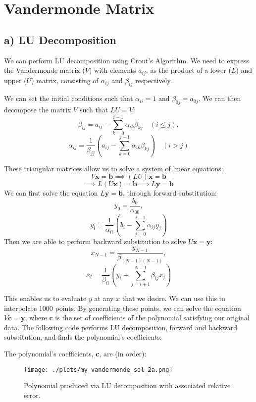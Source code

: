 \section{Vandermonde Matrix}

\subsection*{a) LU Decomposition}

We can perform LU decomposition using Crout's Algorithm.
We need to express the Vandermonde matrix ($V$) with elements $a_{ij}$, as the product of a lower ($L$) and upper ($U$) matrix, consisting of $\alpha_{ij}$ and $\beta_{ij}$ respectively.

We can set the initial conditions such that $\alpha_{ii} = 1$  and $\beta_{0j} = a_{0j}$.
We can then decompose the matrix $V$ such that $LU=V$: 
\[\beta_{ij} = a_{ij} - \sum_{k=0}^{i-1} \alpha_{ik}\beta_{kj} \quad (i \leq j),\]
\[\alpha_{ij} = \frac{1}{\beta_{jj}} \left(a_{ij} - \sum_{k=0}^{j-1}\alpha_{ik}\beta_{kj}\right) \quad (i > j)\]

These triangular matrices allow us to solve a system of linear equations: 
\[ V\textbf{x} = \textbf{b} \implies (LU)\textbf{x} = \textbf{b}\]
\[ \implies L(U\textbf{x}) = \textbf{b} \implies L\textbf{y} = \textbf{b} \]
We can first solve the equation $L\textbf{y} = \textbf{b}$, through forward substitution:
\[ y_0 = \frac{b_0}{\alpha_{00}}, \]
\[ y_i = \frac{1}{\alpha_{ii}} \left(b_i - \sum_{j=0}^{i-1}\alpha_{ij}y_j\right) \]
Then we are able to perform backward substitution to solve $U\textbf{x}=\textbf{y}$: 
\[ x_{N-1} = \frac{y_{N-1}}{\beta_{(N-1)(N-1)}}, \]
\[ x_i = \frac{1}{\beta_{ii}} \left(y_i - \sum_{j = i+1}^{N-1}\beta_{ij}x_j\right) \]

This enables us to evaluate $y$ at any $x$ that we desire.
We can use this to interpolate 1000 points.
By generating these points, we can solve the equation $V\textbf{c}=\textbf{y}$, where \textbf{c} is the set of coefficients of the polynomial satisfying our original data.
The following code performs LU decomposition, forward and backward substitution, and finds the polynomial's coefficients:



The polynomial's coefficients, \textbf{c}, are (in order):



\begin{figure}[h!]
  \centering
  \texttt{[image: ./plots/my\_vandermonde\_sol\_2a.png]}
  \caption{Polynomial produced via LU decomposition with associated relative error.}
\end{figure}
